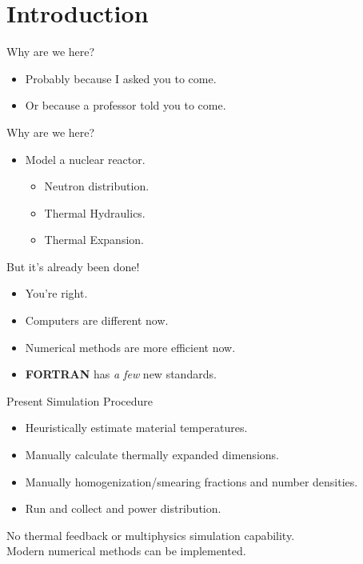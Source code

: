 \section{Introduction}
\label{sec:introduction}

\begin{frame}{Why are we here?}
  \pause
  \begin{itemize}
    \item Probably because I asked you to come.
    \item Or because a professor told you to come.
  \end{itemize}
\end{frame}

\begin{frame}{Why are we here?}
  \begin{itemize}
    \item {\huge Model a nuclear reactor.}
      \pause
      \begin{itemize}
        \item Neutron distribution.
        \item Thermal Hydraulics.
        \item Thermal Expansion.
      \end{itemize}
  \end{itemize}
\end{frame}

\begin{frame}{But it's already been done!}
  \begin{itemize}
    \pause 
    \item You're right.
    \pause
    \item Computers are different now.
    \item Numerical methods are more efficient now.
    \item \textbf{FORTRAN} has \textit{a few} new standards.
  \end{itemize}
\end{frame}

\begin{frame}{Present Simulation Procedure}
  \begin{itemize}
    \item Heuristically estimate material temperatures.
    \item Manually calculate thermally expanded dimensions.
    \item Manually homogenization/smearing fractions and number densities.
    \item Run \dif and collect \keff and power distribution.
    \pause
  \end{itemize}
  \vspace{0.3in}
  \begin{block}{}
    \centering
    No thermal feedback or multiphysics simulation capability.\\
    Modern numerical methods can be implemented.
  \end{block}
\end{frame}

